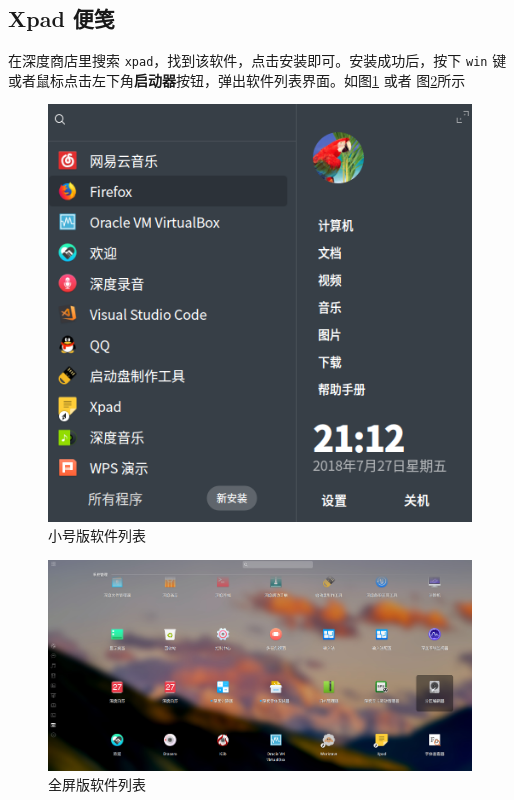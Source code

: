 \documentclass[doctor,openright,twoside]{sjtuthesis}
\newcommand{\passthrough}[1]{#1}
\theoremstyle{plain}
\theoremstyle{definition}
\theoremstyle{remark}
\theoremstyle{ocrenumbox}
\theoremstyle{plain}
\begin{document}
\hypertarget{xpad-}{%
\subsection{Xpad 便笺}\label{xpad-}}

在深度商店里搜索 \passthrough{\lstinline!xpad!}，找到该软件，点击安装即可。安装成功后，按下 \passthrough{\lstinline!win!} 键或者鼠标点击左下角\textbf{启动器}按钮，弹出软件列表界面。如图\ref{fig:xpad-smallscreen} 或者 图\ref{fig:xpad-fullscreen}所示

\begin{figure}

{\centering \includegraphics[width=0.618\linewidth]{images/education-xpad-search-smallscreen} 

}

\caption[小号版软件列表]{小号版软件列表}\label{fig:xpad-smallscreen}
\end{figure}

\begin{figure}

{\centering \includegraphics[width=1\linewidth]{images/education-xpad-search-fullscreen} 

}

\caption[全屏版软件列表]{全屏版软件列表}\label{fig:xpad-fullscreen}
\end{figure}
\end{document}
